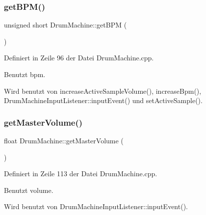 \mbox{\label{class_drum_machine_a9a7a34dca1803071fec5b6687cb98343}} 
\subsubsection{\texorpdfstring{get\+B\+P\+M()}{getBPM()}}
{\footnotesize\ttfamily unsigned short Drum\+Machine\+::get\+B\+PM (\begin{DoxyParamCaption}{ }\end{DoxyParamCaption})}



Definiert in Zeile 96 der Datei Drum\+Machine.\+cpp.



Benutzt bpm.



Wird benutzt von increase\+Active\+Sample\+Volume(), increase\+Bpm(), Drum\+Machine\+Input\+Listener\+::input\+Event() und set\+Active\+Sample().

\mbox{\label{class_drum_machine_a3590f99d021aad35cca24fdcb0f8a246}} 
\subsubsection{\texorpdfstring{get\+Master\+Volume()}{getMasterVolume()}}
{\footnotesize\ttfamily float Drum\+Machine\+::get\+Master\+Volume (\begin{DoxyParamCaption}{ }\end{DoxyParamCaption})}



Definiert in Zeile 113 der Datei Drum\+Machine.\+cpp.



Benutzt volume.



Wird benutzt von Drum\+Machine\+Input\+Listener\+::input\+Event().

\mbox{\label{class_drum_machine_ac4cda2cfef390426515f11cf9ee3199c}} 

